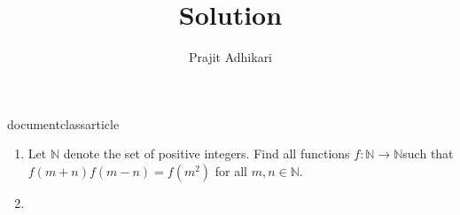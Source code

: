 documentclass{article}
\usepackage[utf8]{inputenc}
\usepackage{amsmath}
\usepackage{amsfonts}




\title{Solution}
\author{Prajit Adhikari}
\maketitle


\begin{enumerate}
    \item Let $\mathbb{N}$ denote the set of positive integers. Find all functions $f: \mathbb{N} \to \mathbb{N}$such that $f(m+n)f(m-n)=f(m^2)$ for all $m,n \in \mathbb{N}$.     
    \item
    \end{enumerate}


